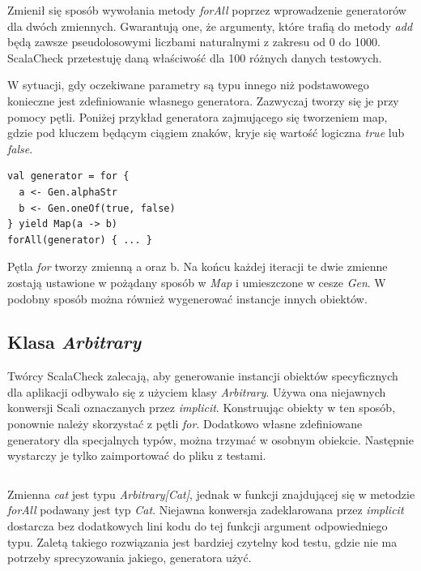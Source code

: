 \documentclass[brudnopis]{xmgr}
\begin{document}
\inputminted[fontsize=\small]{scala}{code/CalcTestOk.scala}

Zmienił się sposób wywołania metody \emph{forAll} poprzez wprowadzenie generatorów dla dwóch zmiennych. Gwarantują one, że argumenty, które trafią do metody \emph{add} będą zawsze pseudolosowymi liczbami naturalnymi z zakresu od 0 do 1000. ScalaCheck przetestuję daną właściwość dla 100 różnych danych testowych. 

W sytuacji, gdy oczekiwane parametry są typu innego niż podstawowego konieczne jest zdefiniowanie własnego generatora. Zazwyczaj tworzy się je przy pomocy pętli. Poniżej przykład generatora zajmującego się tworzeniem map, gdzie pod kluczem będącym ciągiem znaków, kryje się wartość logiczna \emph{true} lub \emph{false}.

\begin{verbatim}
val generator = for {
  a <- Gen.alphaStr  
  b <- Gen.oneOf(true, false)
} yield Map(a -> b)
forAll(generator) { ... }
\end{verbatim}

Pętla \emph{for} tworzy zmienną a oraz b. Na końcu każdej iteracji te dwie zmienne zostają ustawione w pożądany sposób w \emph{Map} i umieszczone w cesze \emph{Gen}. W podobny sposób można również wygenerować instancje innych obiektów. 

\subsection{Klasa \emph{Arbitrary}}

Twórcy ScalaCheck zalecają, aby generowanie instancji obiektów specyficznych dla aplikacji odbywało się z użyciem klasy \emph{Arbitrary}. Używa ona niejawnych konwersji Scali oznaczanych przez \emph{implicit}. Konstruując obiekty w ten sposób, ponownie należy skorzystać z pętli \emph{for}. Dodatkowo własne zdefiniowane generatory dla specjalnych typów, można trzymać w osobnym obiekcie. Następnie wystarczy je tylko zaimportować do pliku z testami.

\inputminted[fontsize=\small]{scala}{code/CatTestArbitrary.scala}

Zmienna \emph{cat} jest typu \emph{Arbitrary[Cat]}, jednak w funkcji znajdującej się w metodzie \emph{forAll} podawany jest typ \emph{Cat}. Niejawna konwersja zadeklarowana przez \emph{implicit} dostarcza bez dodatkowych lini kodu do tej funkcji argument odpowiedniego typu. Zaletą takiego rozwiązania jest bardziej czytelny kod testu, gdzie nie ma potrzeby sprecyzowania jakiego, generatora użyć.
\end{document}
